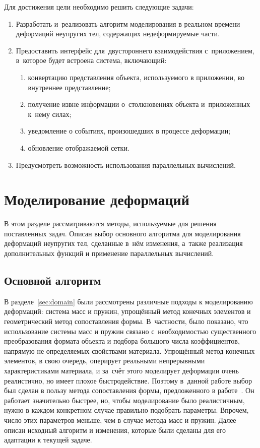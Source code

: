 \documentclass[a4paper, 14pt, titlepage]{extarticle}
\let\oldsection\section
\renewcommand{\section}{\newpage\oldsection}
\begin{document}
    Для достижения цели необходимо решить следующие задачи:
    \begin{enumerate}
      \item Разработать и~реализовать алгоритм моделирования в реальном времени деформаций
        не\-у\-пру\-гих тел, содержащих недеформируемые части.
      \item Предоставить интерфейс для~двустороннего взаимодействия с~приложением, в~которое будет
        встроена система, включающий:
        \begin{enumerate}
          \item конвертацию представления объекта, используемого в приложении, во внутреннее представление;
          \item получение извне информации о~столкновениях объекта и~приложенных к~нему силах;
          \item уведомление о событиях, произошедших в процессе деформации;
          \item обновление отображаемой сетки.
        \end{enumerate}
      \item Предусмотреть возможность использования параллельных вычислений.
    \end{enumerate}

  \section{Моделирование деформаций}

    В этом разделе рассматриваются методы, используемые для решения поставленных задач. Описан выбор
    основного алгоритма для моделирования деформаций неупругих тел, сделанные в~нём изменения,
    а~также реализация дополнительных функций и применение параллельных вычислений.

    \subsection{Основной алгоритм}\label{ssec:basic_algorithm}

      В разделе~\ref{sec:domain} были рассмотрены различные подходы к моделированию деформаций:
      система масс и пружин, упрощённый метод конечных элементов и геометрический метод
      сопоставления формы. В~частности, было показано, что использование системы масс и пружин
      связано с~необходимостью существенного преобразования формата объекта и подбора большого числа
      коэффициентов, напрямую не определяемых свойствами материала. Упрощённый метод конечных
      элементов, в свою очередь, оперирует реальными непрерывными характеристиками материала, и
      за~счёт этого моделирует деформации очень реалистично, но имеет плохое быстродействие. Поэтому
      в~данной работе выбор был сделан в пользу метода сопоставления формы, предложенного в
      работе~\cite{mueller-meshless}. Он работает значительно быстрее, но, чтобы моделирование было
      реалистичным, нужно в каждом конкретном случае правильно подобрать параметры. Впрочем, число
      этих параметров меньше, чем в случае метода масс и пружин. Далее описан исходный алгоритм и
      изменения, которые были сделаны для его адаптации к текущей задаче.
\end{document}
